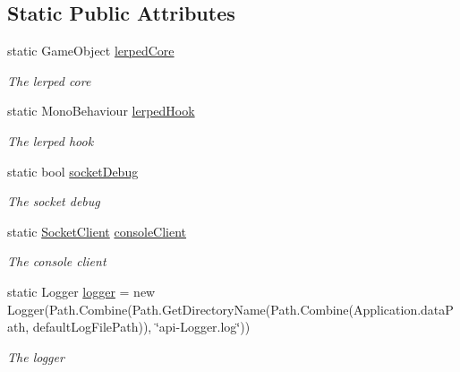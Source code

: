 \subsection*{Static Public Attributes}
\begin{DoxyCompactItemize}
\item 
static Game\+Object \hyperlink{class_lerp2_a_p_i_1_1_lerped_core_a4a12bc9584309efdafb06167891aa81a}{lerped\+Core}
\begin{DoxyCompactList}\small\item\em The lerped core \end{DoxyCompactList}\item 
static Mono\+Behaviour \hyperlink{class_lerp2_a_p_i_1_1_lerped_core_a36e47f8f40f67a5a4f05398a161f8668}{lerped\+Hook}
\begin{DoxyCompactList}\small\item\em The lerped hook \end{DoxyCompactList}\item 
static bool \hyperlink{class_lerp2_a_p_i_1_1_lerped_core_ab9fe283b5fb0fc1b969c3c65ace74eb4}{socket\+Debug}
\begin{DoxyCompactList}\small\item\em The socket debug \end{DoxyCompactList}\item 
static \hyperlink{class_lerp2_a_p_i_1_1_communication_1_1_sockets_1_1_socket_client}{Socket\+Client} \hyperlink{class_lerp2_a_p_i_1_1_lerped_core_a16e880ea6278c92f3363dabb264a0eba}{console\+Client}
\begin{DoxyCompactList}\small\item\em The console client \end{DoxyCompactList}\item 
static Logger \hyperlink{class_lerp2_a_p_i_1_1_lerped_core_a81701bd0c747037174737366a3c9e39b}{logger} = new Logger(Path.\+Combine(Path.\+Get\+Directory\+Name(Path.\+Combine(Application.\+data\+Path, default\+Log\+File\+Path)), \char`\"{}api-\/Logger.\+log\char`\"{}))
\begin{DoxyCompactList}\small\item\em The logger \end{DoxyCompactList}\end{DoxyCompactItemize}
